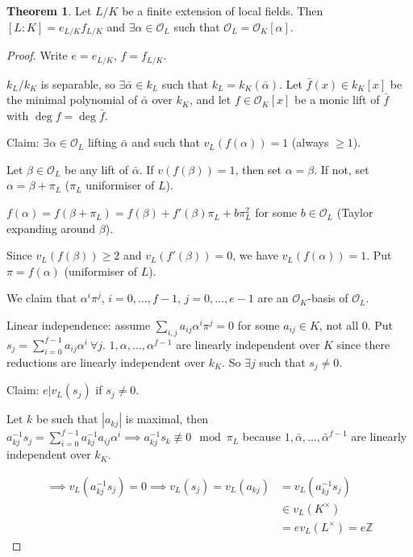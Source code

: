 \documentclass[a4paper]{article}
\theoremstyle{definition}
\theoremstyle{default}
\newtheorem{theorem}[definition]{Theorem}
\theoremstyle{remark}
\newcommand*\abs[1]{\left|#1\right|}
\begin{document}
\begin{theorem}
	Let $L/K$ be a finite extension of local fields.
	Then $[L:K] = e_{L/K}f_{L/K}$ and $\exists \alpha \in \mathcal{O}_L$ such that $\mathcal{O}_L = \mathcal{O}_K[\alpha]$.
	\label{70}
\end{theorem}
\begin{proof}
	Write $e=e_{L/K}$, $f=f_{L/K}$.
	
	$k_L/k_K$ is separable,
	so $\exists \bar{\alpha} \in k_L$ such that $k_L = k_K(\bar{\alpha})$.
	Let $\bar{f}(x) \in k_K[x]$ be the minimal polynomial of $\bar{\alpha}$ over $k_K$,
	and let $f \in \mathcal{O}_K[x]$ be a monic lift of $\bar{f}$ with $\deg f = \deg \bar{f}$.
	
	Claim: $\exists \alpha \in \mathcal{O}_L$ lifting $\bar{\alpha}$ and such that $v_L(f(\alpha)) = 1$ (always $\geq 1$).
	
	Let $\beta \in \mathcal{O}_L$ be any lift of $\bar{\alpha}$.
	If $v(f(\beta)) = 1$, then set $\alpha = \beta$.
	If not, set $\alpha = \beta + \pi_L$ ($\pi_L$ uniformiser of $L$).
	
	$f(\alpha) = f(\beta+ \pi_L) = f(\beta)+f'(\beta)\pi_L + b \pi_L^2$ for some $b \in \mathcal{O}_L$ (Taylor expanding around $\beta$).
	
	Since $v_L(f(\beta)) \geq 2$ and $v_L(f'(\beta)) = 0$,
	we have $v_L(f(\alpha)) = 1$.
	Put $\pi = f(\alpha)$ (uniformiser of $L$).
	
	We claim that $\alpha^i\pi^j$,
	$i=0,\dots,f-1$, $j=0,\dots,e-1$ are an $\mathcal{O}_K$-basis of $\mathcal{O}_L$.
	
	Linear independence: assume $\sum_{i,j}a_{ij}\alpha^i\pi^j=0$ for some $a_{ij} \in K$, not all 0.
	Put $s_j = \sum_{i=0}^{f-1}a_{ij}\alpha^i\ \forall j$.
	$1, \alpha, \dots, \alpha^{f-1}$ are linearly independent over $K$ since there reductions are linearly independent over $k_K$.
	So $\exists j$ such that $s_j \neq 0$.
	
	Claim: $e | v_L(s_j)$ if $s_j \neq 0$.
	
	Let $k$ be such that $\abs{a_{kj}}$ is maximal,
	then $a_{kj}^{-1}s_j = \sum_{i=0}^{f-1}a_{kj}^{-1}a_{ij}\alpha^i \implies a_{kj}^{-1}s_k \not\equiv 0 \mod \pi_L$
	because $1, \bar{\alpha}, \dots, \bar{\alpha}^{f-1}$ are linearly independent over $k_K$.
	
	\begin{align*}
		\implies v_L(a_{kj}^{-1}s_j) = 0 \implies v_L(s_j) = v_L(a_{kj}) &= v_L(a_{kj}^{-1}s_j) \\
		&\in v_L(K^\times) \\
		&= ev_L(L^\times) = e\mathbb{Z}
	\end{align*}
	

\end{proof}
\end{document}
